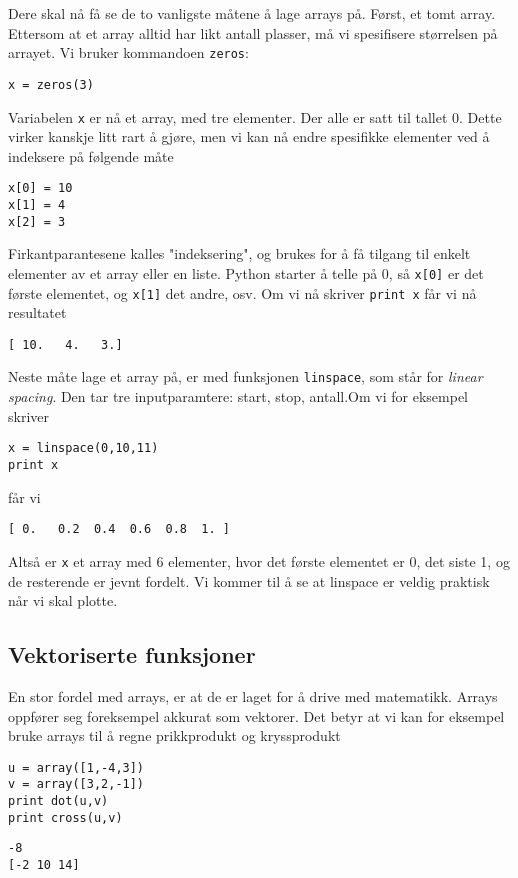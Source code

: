 \documentclass[a4paper, 11pt, notitlepage, english]{article}
\begin{document}
Dere skal nå få se de to vanligste måtene å lage arrays på. Først, et tomt array. Ettersom at et array alltid har likt antall plasser, må vi spesifisere størrelsen på arrayet. Vi bruker kommandoen \verb+zeros+:
\begin{lstlisting}
x = zeros(3)    
\end{lstlisting}
\vspace{-0.3cm}
Variabelen \verb+x+ er nå et array, med tre elementer. Der alle er satt til tallet 0. Dette virker kanskje litt rart å gjøre, men vi kan nå endre spesifikke elementer ved å indeksere på følgende måte
\begin{lstlisting}
x[0] = 10
x[1] = 4
x[2] = 3
\end{lstlisting}
\vspace{-0.3cm}
Firkantparantesene kalles "indeksering", og brukes for å få tilgang til enkelt elementer av et array eller en liste. Python starter å telle på 0, så \verb+x[0]+ er det første elementet, og \verb+x[1]+ det andre, osv.
Om vi nå skriver \verb+print x+ får vi nå resultatet
\begin{lstlisting}
[ 10.   4.   3.]
\end{lstlisting}
\vspace{-0.3cm}

Neste måte lage et array på, er med funksjonen \verb+linspace+, som står for \emph{linear spacing}. Den tar tre inputparamtere: start, stop, antall.Om vi for eksempel skriver
\begin{lstlisting}
x = linspace(0,10,11)
print x
\end{lstlisting}
\vspace{-0.3cm}
får vi 
\begin{lstlisting}
[ 0.   0.2  0.4  0.6  0.8  1. ]
\end{lstlisting}
\vspace{-0.3cm}
Altså er \verb+x+ et array med 6 elementer, hvor det første elementet er 0, det siste 1, og de resterende er jevnt fordelt. Vi kommer til å se at linspace er veldig praktisk når vi skal plotte.

\subsection{Vektoriserte funksjoner}
En stor fordel med arrays, er at de er laget for å drive med matematikk. Arrays oppfører seg foreksempel akkurat som vektorer. Det betyr at vi kan for eksempel bruke arrays til å regne prikkprodukt og kryssprodukt
\begin{lstlisting}
u = array([1,-4,3])
v = array([3,2,-1])
print dot(u,v)
print cross(u,v)
\end{lstlisting}
\vspace{-0.3cm}
\begin{lstlisting}
-8
[-2 10 14]
\end{lstlisting}
\vspace{-0.3cm}
\end{document}
